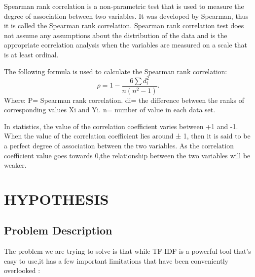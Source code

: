 \documentclass{mnnit}
\begin{document}
Spearman rank correlation is a non-parametric test that is used to measure the degree of association between two variables.  It was developed by Spearman, thus it is called the Spearman rank correlation.  Spearman rank correlation test does not assume any assumptions about the distribution of the data and is the appropriate correlation analysis when the variables are measured on a scale that is at least ordinal.

\noindent The following formula is used to calculate the Spearman rank correlation:
\[
 \rho = {1- \frac {6 \sum d_i^2}{n(n^2 - 1)}}.
\]
Where:
\newline
P= Spearman rank correlation.
\newline
di= the difference between the ranks of corresponding values Xi and Yi.
\newline
n= number of value in each data set.
\vspace{3 mm}
\newline

\noindent In statistics, the value of the correlation coefficient varies between +1 and -1.  When the value of the correlation coefficient lies around ± 1, then it is said to be a perfect degree of association between the two variables.  As the correlation coefficient value goes towards 0,the relationship between the two variables will be weaker.

\newpage 

\chapter{HYPOTHESIS}

\section{Problem Description}
The problem we are trying to solve is that while TF-IDF is a powerful tool that’s easy to use,it has a few important limitations that have been conveniently overlooked :
\end{document}

